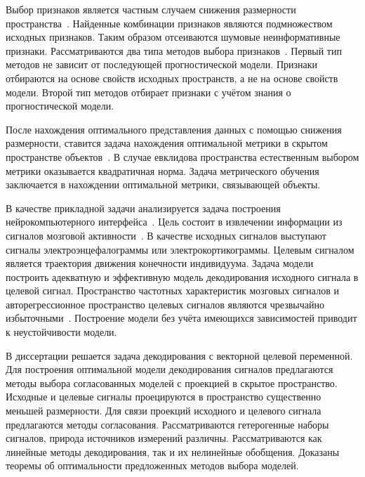 Выбор признаков является частным случаем снижения размерности пространства~\cite{katrutsa2017comprehensive,katrutsa2015stress}. 
Найденные комбинации признаков являются подмножеством исходных признаков.
Таким образом отсеиваются шумовые неинформативные признаки.
Рассматриваются два типа методов выбора признаков~\cite{li2017feature,rodriguez2010quadratic,friedman2001elements}.
Первый тип методов не зависит от последующей прогностической модели.
Признаки отбираются на основе свойств исходных пространств, а не на основе свойств модели.
Второй тип методов отбирает признаки с учётом знания о прогностической модели. 

После нахождения оптимального представления данных с помощью снижения размерности, ставится задача нахождения оптимальной метрики в скрытом пространстве объектов~\cite{wang2017deep,davis2007information,kulis2012metric,yang2006distance,weinberger2009distance}.
В случае евклидова пространства естественным выбором метрики оказывается квадратичная норма.
Задача метрического обучения заключается в нахождении оптимальной метрики, связывающей объекты.

В качестве прикладной задачи анализируется задача построения нейрокомпьютерного интерфейса~\cite{wolpaw2000brain,allison2007brain}. 
Цель состоит в извлечении информации из сигналов мозговой активности~\cite{nagel2018modelling,zhang2020survey,chiarelli2018deep}. 
В качестве исходных сигналов выступают сигналы электроэнцефалограммы или электрокортикограммы. 
Целевым сигналом является траектория движения конечности индивидуума.
Задача модели построить адекватную и эффективную модель декодирования исходного сигнала в целевой сигнал.
Пространство частотных характеристик мозговых сигналов и авторегрессионное пространство целевых сигналов являются чрезвычайно избыточными~\cite{eliseyev2013recursive,eliseyev2011iterative}. 
Построение модели без учёта имеющихся зависимостей приводит к неустойчивости модели.

В диссертации решается задача декодирования с векторной целевой переменной. 
Для построения оптимальной модели декодирования сигналов предлагаются методы выбора согласованных моделей с проекцией в скрытое пространство.
Исходные и целевые сигналы проецируются в пространство существенно меньшей размерности. 
Для связи проекций исходного и целевого сигнала предлагаются методы согласования.
Рассматриваются гетерогенные наборы сигналов, природа источников измерений различны.
Рассматриваются как линейные методы декодирования, так и их нелинейные обобщения.
Доказаны теоремы об оптимальности предложенных методов выбора моделей.

